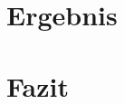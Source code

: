 \documentclass[intern,palatino]{cgBA}
\begin{document}
\section{Ergebnis}\label{ergebnis}


\section{Fazit}\label{fazit}



\newpage
\listoffigures
\newpage

\end{document}
